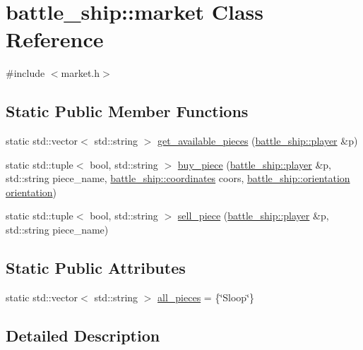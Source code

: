 \hypertarget{classbattle__ship_1_1market}{}\section{battle\+\_\+ship\+:\+:market Class Reference}
\label{classbattle__ship_1_1market}


{\ttfamily \#include $<$market.\+h$>$}

\subsection*{Static Public Member Functions}
\begin{DoxyCompactItemize}
\item 
static std\+::vector$<$ std\+::string $>$ \hyperlink{classbattle__ship_1_1market_a51ff4c8a34dd27f8bb8fcf5cffcdfd95}{get\+\_\+available\+\_\+pieces} (\hyperlink{classbattle__ship_1_1player}{battle\+\_\+ship\+::player} \&p)
\item 
static std\+::tuple$<$ bool, std\+::string $>$ \hyperlink{classbattle__ship_1_1market_abe69f96f41fb16a74dc26b5a091d964d}{buy\+\_\+piece} (\hyperlink{classbattle__ship_1_1player}{battle\+\_\+ship\+::player} \&p, std\+::string piece\+\_\+name, \hyperlink{structbattle__ship_1_1coordinates}{battle\+\_\+ship\+::coordinates} coors, \hyperlink{namespacebattle__ship_aed87488f0a73f0d0679fe343fb61c784}{battle\+\_\+ship\+::orientation} \hyperlink{namespacebattle__ship_aed87488f0a73f0d0679fe343fb61c784}{orientation})
\item 
static std\+::tuple$<$ bool, std\+::string $>$ \hyperlink{classbattle__ship_1_1market_ac8392668f9db1fca65c6e9072a59eb43}{sell\+\_\+piece} (\hyperlink{classbattle__ship_1_1player}{battle\+\_\+ship\+::player} \&p, std\+::string piece\+\_\+name)
\end{DoxyCompactItemize}
\subsection*{Static Public Attributes}
\begin{DoxyCompactItemize}
\item 
static std\+::vector$<$ std\+::string $>$ \hyperlink{classbattle__ship_1_1market_a1bc7fb6748d38524516703c171a7041d}{all\+\_\+pieces} = \{\char`\"{}Sloop\char`\"{}\}
\end{DoxyCompactItemize}


\subsection{Detailed Description}



